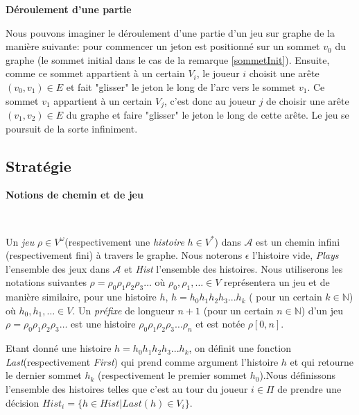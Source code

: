 

\noindent\textbf{Déroulement d'une partie}\label{derPar}

Nous pouvons imaginer le déroulement d'une partie d'un jeu sur graphe de la manière suivante: pour commencer un jeton est positionné sur un sommet $v_{0}$ du graphe (le sommet initial dans le cas de la remarque \ref{sommetInit}). Ensuite, comme ce sommet appartient à un certain $V_{i}$, le joueur $i$ choisit une arête $(v_{0},v_{1}) \in E$ et fait "glisser" le jeton le long de l'arc vers le sommet $v_{1}$. Ce sommet $v_{1}$ appartient à un certain $V_{j}$, c'est donc au joueur $j$ de choisir une arête $(v_{1},v_{2})\in E$ du graphe et faire "glisser" le jeton le long de cette arête. Le jeu se poursuit de la sorte infiniment. \\


\subsection{Stratégie}




\noindent\textbf{Notions de chemin et de jeu}

\\

Un \textit{jeu} $\rho \in V^{\omega}$(respectivement une \textit{histoire} $h \in V^{*}$) dans $\mathcal{A}$ est un chemin infini (respectivement fini) à travers le graphe. Nous noterons $\epsilon$ l'histoire vide, \textit{Plays} l'ensemble des jeux dans $\mathcal{A}$ et \textit{Hist} l'ensemble des histoires. Nous utiliserons les notations suivantes $\rho = \rho _{0}  \rho _{1} \rho _{2}\rho _{3} \ldots$ où $\rho _{0},  \rho _{1},\ldots \in V$ représentera un jeu et de manière similaire, pour une histoire $h$, $ h = h_{0} h_{1} h_{2} h_{3} ... h_{k}$ ( pour un certain $k \in \mathbb{N}$) où  $h_{0}, h_{1}, \ldots \in V$.
Un \textit{préfixe} de longueur $n+1$ (pour un certain $n\in \mathbb{N}$) d'un jeu $\rho = \rho _{0}  \rho _{1} \rho _{2}\rho _{3} \ldots$ est une histoire $\rho _{0}  \rho _{1} \rho _{2}\rho _{3} \ldots \rho _{n}$ et est notée $\rho[0,n]$.

Etant donné une histoire $ h = h_{0} h_{1} h_{2} h_{3} ... h_{k}$,  on définit une fonction \textit{Last}(respectivement \textit{First}) qui prend comme argument l'histoire $h$ et qui retourne le dernier sommet $h_{k}$ (respectivement le premier sommet $h_{0}$).Nous définissons l'ensemble des histoires telles que c'est au tour du joueur $i \in \Pi$ de prendre une décision $Hist_{i} = \{ h \in Hist | Last(h) \in V_{i} \}$.

